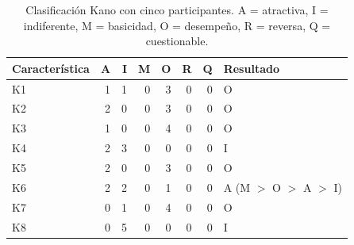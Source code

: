\begin{table}[H]
\centering
\footnotesize
\caption{Clasificación Kano con cinco participantes. A = atractiva, I = indiferente, M = basicidad, O = desempeño, R = reversa, Q = cuestionable.}
\label{tab:kanoconteo}
\begin{tabular}{@{}lrrrrrrl@{}}
\toprule
Característica & A & I & M & O & R & Q & Resultado \\
\midrule
K1 & 1 & 1 & 0 & 3 & 0 & 0 & O \\
K2 & 2 & 0 & 0 & 3 & 0 & 0 & O \\
K3 & 1 & 0 & 0 & 4 & 0 & 0 & O \\
K4 & 2 & 3 & 0 & 0 & 0 & 0 & I \\
K5 & 2 & 0 & 0 & 3 & 0 & 0 & O \\
K6 & 2 & 2 & 0 & 1 & 0 & 0 & A (M $>$ O $>$ A $>$ I) \\
K7 & 0 & 1 & 0 & 4 & 0 & 0 & O \\
K8 & 0 & 5 & 0 & 0 & 0 & 0 & I \\
\bottomrule
\end{tabular}
\end{table}

